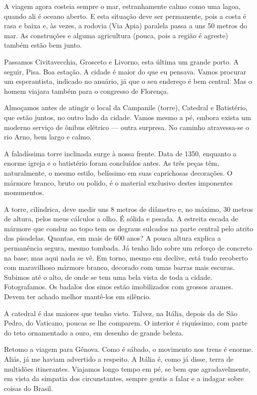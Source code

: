 A viagem agora costeia sempre o mar, estranhamente calmo como uma lagoa, quando ali é oceano aberto. E esta situação deve ser permanente, pois a costa é rasa e baixa e, às vezes, a rodovia (Via Apia) paralela passa a uns 50 metros do mar. As construções e alguma agricultura (pouca, pois a região é agreste) também estão bem junto.

Passamos Civitavecchia, Grosceto e Livorno, esta última um grande porto. A seguir, Pisa. Boa estação. A cidade é maior do que eu pensava. Vamos procurar um esperantista, indicado no anuário, já que o seu endereço é bem central. Mas o homem viajara também para o congresso de Florença.

Almoçamos antes de atingir o local da Campanile (torre), Catedral e Batistério, que estão juntos, no outro lado da cidade. Vamos mesmo a pé, embora exista um moderno serviço de ônibus elétrico --- outra surpresa. No caminho atravessa-se o rio Arno, bem largo e calmo.

A faladíssima torre inclinada surge à nossa frente. Data de 1350, enquanto a enorme igreja e o batistério foram concluídos antes. As três peças têm, naturalmente, o mesmo estilo, belíssimo em suas caprichosas decorações. O mármore branco, bruto ou polido, é o material exclusivo destes imponentes monumentos.

A torre, cilíndrica, deve medir uns 8 metros de diâmetro e, no máximo, 30 metros de altura, pelos meus cálculos a olho. É sólida e pesada. A estreita escada de mármore que conduz ao topo tem os degraus sulcados na parte central pelo atrito das pisadelas. Quantas, em mais de 600 anos? A pouca altura explica a permanência segura, mesmo tombada. Já tenho lido sobre um reforço de concreto na base; mas aqui nada se vê. Em torno, mesmo em declive, está tudo recoberto com maravilhoso mármore branco, decorado com umas barras mais escuras. Subimos até o alto, de onde se tem uma bela vista de toda a cidade. Fotografamos. Os badalos dos sinos estão imobilizados com grossos arames. Devem ter achado melhor mantê-los em silêncio.

A catedral é das maiores que tenho visto. Talvez, na Itália, depois da de São Pedro, do Vaticano, poucas se lhe comparem. O interior é riquíssimo, com parte do teto ornamentado a ouro, em desenho de grande beleza.

Retomo a viagem para Gênova. Como é sábado, o movimento nos trens é enorme. Aliás, já me haviam advertido a respeito. A Itália é, como já disse, terra de multidões itinerantes. Viajamos longo tempo em pé, se bem que agradavelmente, em vista da simpatia dos circunstantes, sempre gentis a falar e a indagar sobre coisas do Brasil.

